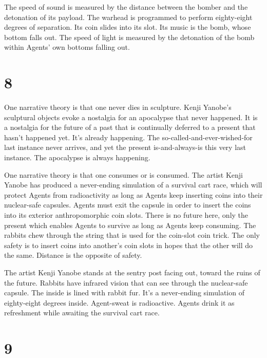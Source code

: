 \documentclass[
]{memoir}
\begin{document}
The speed of sound is measured by the distance between the bomber and
the detonation of its payload. The warhead is programmed to perform
eighty-eight degrees of separation. Its coin slides into its slot. Its
music is the bomb, whose bottom falls out. The speed of light is
measured by the detonation of the bomb within Agents' own bottoms
falling out.

\hypertarget{section-9}{%
\section*{8}\label{section-9}}

One narrative theory is that one never dies in sculpture. Kenji Yanobe's
sculptural objects evoke a nostalgia for an apocalypse that never
happened. It is a nostalgia for the future of a past that is continually
deferred to a present that hasn't happened yet. It's already happening.
The so-called-and-ever-wished-for last instance never arrives, and yet
the present is-and-always-is this very last instance. The apocalypse is
always happening.

One narrative theory is that one consumes or is consumed. The artist
Kenji Yanobe has produced a never-ending simulation of a survival cart
race, which will protect Agents from radioactivity as long as Agents
keep inserting coins into their nuclear-safe capsules. Agents must exit
the capsule in order to insert the coins into its exterior
anthropomorphic coin slots. There is no future here, only the present
which enables Agents to survive as long as Agents keep consuming. The
rabbits chew through the string that is used for the coin-slot coin
trick. The only safety is to insert coins into another's coin slots in
hopes that the other will do the same. Distance is the opposite of
safety.

The artist Kenji Yanobe stands at the sentry post facing out, toward the
ruins of the future. Rabbits have infrared vision that can see through
the nuclear-safe capsule. The inside is lined with rabbit fur. It's a
never-ending simulation of eighty-eight degrees inside. Agent-sweat is
radioactive. Agents drink it as refreshment while awaiting the survival
cart race.

\hypertarget{section-10}{%
\section*{9}\label{section-10}}
\end{document}

